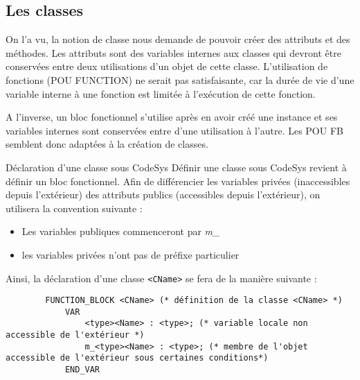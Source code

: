 \subsection{Les classes}

On l'a vu, la notion de classe nous demande de pouvoir créer des attributs et des méthodes. Les attributs sont des variables internes aux classes qui devront être conservées entre deux utilisations d'un objet de cette classe.
L'utilisation de fonctions (POU FUNCTION) ne serait pas satisfaisante, car la durée de vie d'une variable interne à une fonction est limitée à l'exécution de cette fonction.

A l'inverse, un bloc fonctionnel s'utilise après en avoir créé une instance et ses variables internes sont conservées entre d'une utilisation à l'autre. Les POU FB semblent donc adaptées à la création de classes.


\begin{UPSTIinfor}{Déclaration d'une classe sous CodeSys}
    Définir une classe sous CodeSys revient à définir un bloc fonctionnel. Afin de différencier les variables privées (inaccessibles depuis l'extérieur) des attributs publics (accessibles depuis l'extérieur), on utilisera la convention suivante :
    \begin{itemize}
        \item Les variables publiques commenceront par \emph{m\_}
        \item les variables privées n'ont pas de préfixe particulier
    \end{itemize}

    Ainsi, la déclaration d'une classe \lstinline[language=ST]{<CName>} se fera de la manière suivante :
    \begin{lstlisting}
        FUNCTION_BLOCK <CName> (* définition de la classe <CName> *)
            VAR
                <type><Name> : <type>; (* variable locale non accessible de l'extérieur *)
                m_<type><Name> : <type>; (* membre de l'objet accessible de l'extérieur sous certaines conditions*)
            END_VAR
    \end{lstlisting}
\end{UPSTIinfor}

